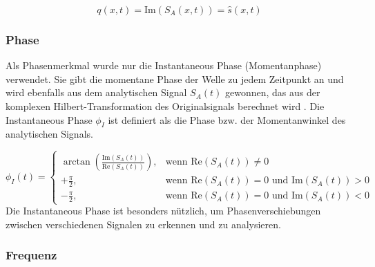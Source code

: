 \begin{equation}
    q(x,t) = \text{Im}(S_A(x,t)) = \hat{s}(x,t)
\end{equation}


\subsubsection{Phase}

Als Phasenmerkmal wurde nur die Instantaneous Phase (Momentanphase) \parencite{taner_complex_1979} verwendet. Sie gibt die momentane Phase der Welle zu jedem Zeitpunkt an und wird ebenfalls aus dem analytischen Signal $S_A(t)$ gewonnen, das aus der komplexen Hilbert-Transformation des Originalsignals berechnet wird \parencite[S. 177]{sheriff_encyclopedic_2002}. Die Instantaneous Phase $\phi_I$ ist definiert als die Phase bzw. der Momentanwinkel des analytischen Signals.

\begin{equation}
    \phi_I(t) =
    \begin{cases}
        \arctan\left(\frac{\text{Im}(S_A(t))}{\text{Re}(S_A(t))}\right), & \text{wenn } \text{Re}(S_A(t)) \neq 0 \\
        +\frac{\pi}{2}, & \text{wenn } \text{Re}(S_A(t)) = 0 \text{ und } \text{Im}(S_A(t)) > 0 \\
        -\frac{\pi}{2}, & \text{wenn } \text{Re}(S_A(t)) = 0 \text{ und } \text{Im}(S_A(t)) < 0
    \end{cases}
\end{equation}
Die Instantaneous Phase ist besonders nützlich, um Phasenverschiebungen zwischen verschiedenen Signalen zu erkennen und zu analysieren.


\subsubsection{Frequenz}

